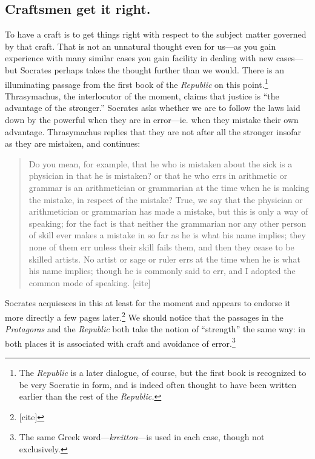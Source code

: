 \documentclass[11pt]{amsart}
\begin{document}
\subsection{Craftsmen get it right.} To have a craft is to get things
right with respect to the subject matter governed by that craft. That
is not an unnatural thought even for us---as you gain experience with
many similar cases you gain facility in dealing with new cases---but
Socrates perhaps takes the thought further than we would. There is an
illuminating passage from the first book of the \emph{Republic} on
this point.\footnote{The \emph{Republic} is a later dialogue, of
course, but the first book is recognized to be very Socratic in form,
and is indeed often thought to have been written earlier than the rest
of the \emph{Republic.}} Thrasymachus, the interlocutor of the moment,
claims that justice is ``the advantage of the stronger.'' Socrates
asks whether we are to follow the laws laid down by the powerful when
they are in error---ie. when they mistake their own advantage.
Thrasymachus replies that they are not after all the stronger insofar
as they are mistaken, and continues:\begin{quote}Do you mean, for
example, that he who is mistaken about the sick is a physician in that
he is mistaken? or that he who errs in arithmetic or grammar is an
arithmetician or grammarian at the time when he is making the mistake,
in respect of the mistake? True, we say that the physician or
arithmetician or grammarian has made a mistake, but this is only a way
of speaking; for the fact is that neither the grammarian nor any other
person of skill ever makes a mistake in so far as he is what his name
implies; they none of them err unless their skill fails them, and then
they cease to be skilled artists. No artist or sage or ruler errs at
the time when he is what his name implies; though he is commonly said
to err, and I adopted the common mode of speaking. [cite]\end{quote}
Socrates acquiesces in this at least for the moment and appears to
endorse it more directly a few pages later.\footnote{[cite]} We should
notice that the passages in the \emph{Protagoras} and the
\emph{Republic} both take the notion of ``strength'' the same way: in
both places it is associated with craft and avoidance of
error.\footnote{The same Greek word---\emph{kreitton}---is used in
each case, though not exclusively.}\\
\end{document}
